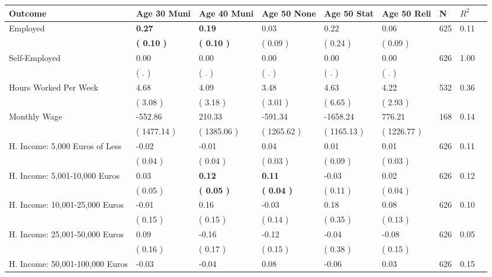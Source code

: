 \begin{tabular}{L{6.2cm} C{1.8cm} C{1.8cm} C{1.8cm} C{1.8cm} C{1.8cm} C{1.8cm} C{0.3cm} C{0.3cm}}
\toprule
 \textbf{Outcome} & \textbf{Age 30 Muni} & \textbf{Age 40 Muni} & \textbf{Age 50 None} & \textbf{Age 50 Stat} & \textbf{Age 50 Reli} & \textbf{N} & \textbf{$ R^2$} \\
\midrule
Employed & \textbf{     0.27} & \textbf{     0.19} &      0.03 &      0.22 &      0.06  & 625 &       0.11 \\ 
 & \textbf{(     0.10 )} & \textbf{(     0.10 )} & (     0.09 ) & (     0.24 ) & (     0.09 )  & \\
Self-Employed &      0.00 &      0.00 &      0.00 &      0.00 &      0.00  & 626 &       1.00 \\ 
 & (        . ) & (        . ) & (        . ) & (        . ) & (        . )  & \\
Hours Worked Per Week &      4.68 &      4.09 &      3.48 &      4.63 &      4.22  & 532 &       0.36 \\ 
 & (     3.08 ) & (     3.18 ) & (     3.01 ) & (     6.65 ) & (     2.93 )  & \\
Monthly Wage &   -552.86 &    210.33 &   -591.34 &  -1658.24 &    776.21  & 168 &       0.14 \\ 
 & (  1477.14 ) & (  1385.06 ) & (  1265.62 ) & (  1165.13 ) & (  1226.77 )  & \\
H. Income: 5,000 Euros of Less &     -0.02 &     -0.01 &      0.04 &      0.01 &      0.01  & 626 &       0.11 \\ 
 & (     0.04 ) & (     0.04 ) & (     0.03 ) & (     0.09 ) & (     0.03 )  & \\
H. Income: 5,001-10,000 Euros &      0.03 & \textbf{     0.12} & \textbf{     0.11} &     -0.03 &      0.02  & 626 &       0.12 \\ 
 & (     0.05 ) & \textbf{(     0.05 )} & \textbf{(     0.04 )} & (     0.11 ) & (     0.04 )  & \\
H. Income: 10,001-25,000 Euros &     -0.01 &      0.16 &     -0.03 &      0.18 &      0.08  & 626 &       0.10 \\ 
 & (     0.15 ) & (     0.15 ) & (     0.14 ) & (     0.35 ) & (     0.13 )  & \\
H. Income: 25,001-50,000 Euros &      0.09 &     -0.16 &     -0.12 &     -0.04 &     -0.08  & 626 &       0.05 \\ 
 & (     0.16 ) & (     0.17 ) & (     0.15 ) & (     0.38 ) & (     0.15 )  & \\
H. Income: 50,001-100,000 Euros &     -0.03 &     -0.04 &      0.08 &     -0.06 &      0.03  & 626 &       0.15 \\ 

\end{tabular}
